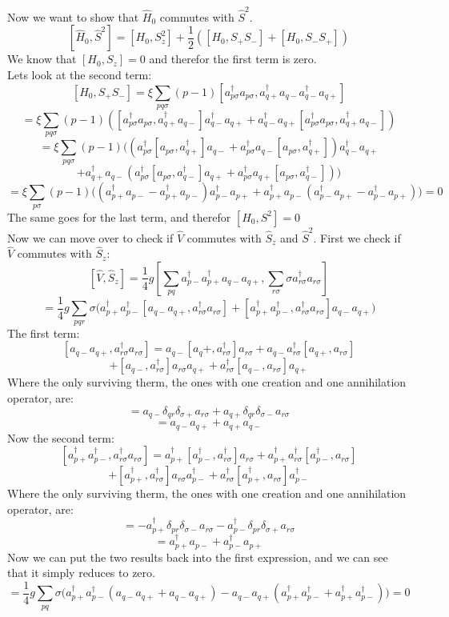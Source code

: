 \documentclass[a4paper,12pt]{article}
\begin{document}
Now we want to show that $\hat{ H}_0$ commutes with $\hat{ S}^2$.\\
$$[\hat{ H}_0, \hat{ S}^2] = [H_0,S_z^2] + \frac{1}{2} ([H_0,S_+S_-] + [H_0,S_-S_+])$$
We know that $[H_0,S_z] = 0$ and therefor the first term is zero.\\
Lets look at the second term:
$$[H_0,S_+S_-] = ξ  ∑_{ pq σ }^{} (p-1)[a_{p σ}^{†}a_{p σ},  a_{q + }^{†}a_{q -} a_{q-}^{†}a_{q+}]$$
$$ = ξ  ∑_{ pq σ }^{} (p-1) \left( 
[a_{p σ}^{†}a_{p σ},  a_{q + }^{†}a_{q -}]a_{q-}^{†}a_{q+}
+ 
a_{q-}^{†}a_{q+}[a_{p σ}^{†}a_{p σ},  a_{q + }^{†}a_{q -}]
\right)$$
$$ = ξ  ∑_{ pq σ }^{} (p-1) \Big(
    \left( a_{p σ}^{†} [a_{p σ}, a_{q + }^{†}] a_{q -} + a_{p σ}^{†} a_{q -} [a_{p σ}, a_{q + }^{†}] \right) a_{q-}^{†}a_{q+}$$
$$+
    a_{q+}^{†}a_{q-} \left( a_{p σ}^{†} [a_{p σ}, a_{q - }^{†}] a_{q +} + a_{p σ}^{†} a_{q +} [a_{p σ}, a_{q - }^{†}] \right)
\Big)$$
$$ = ξ  ∑_{ p σ }^{} (p-1) \Big( 
    \left( a_{p+}^{†}a_{p-} - a_{p+}^{†}a_{p-} \right)a_{p-}^{†}a_{p+} + a_{p+}^{†}a_{p-}\left( a_{p-}^{†}a_{p+} - a_{p-}^{†}a_{p+} \right) 
\Big) = 0$$
The same goes for the last term, and therefor $[H_0,S^2] = 0$\\ 
Now we can move over to check if $\hat{ V}$ commutes with $\hat{ S}_z$ and $\hat{ S}^2$. First we check if $\hat{ V}$ commutes with $\hat{ S}_z$:
$$[\hat{ V}, \hat{ S}_z] = \frac{1}{4} g[∑_{pq}^{} a_{p-}^{†}a_{p+}^{†} a_{q-}a_{q+}, ∑_{r σ }^{}σ a_{r σ}^{†}a_{r σ }]$$
$$ = \frac{1}{4} g ∑_{pqr} σ \Big( a_{p+}^{†} a_{p-}^{†}[a_{q-}a_{q+}, a_{r σ}^{†}a_{r σ}] + [a_{p+}^{†}a_{p-}^{†}, a_{r σ}^{†}a_{r σ}]a_{q-}a_{q+} \Big)$$
The first term: 
$$[a_{q-}a_{q+}, a_{r σ}^{†}a_{r σ}] = a_{q-}[a_q+,a_{r σ }^{†}]a_{r σ} + a_{q-}a_{r σ }^{†}[a_{q+},a_{r σ}]$$
$$ +  [a_{q-},a_{r σ}^{†}]a_{r σ}a_{q+} + a_{r σ}^{†}[a_{q-},a_{r σ}]a_{q+}$$
Where the only surviving therm, the ones with one creation and one annihilation operator, are:
$$ = a_{q-}δ_{qr}δ_{σ+}a_{r σ} + a_{q+}δ_{qr}δ_{σ-}a_{r σ}$$
$$ = a_{q-}a_{q +} + a_{q+}a_{q-}$$
Now the second term:
$$[a_{p+}^{†}a_{p-}^{†}, a_{r σ}^{†}a_{r σ}] = a_{p+}^{†}[a_{p-}^{†},a_{r σ}^{†}]a_{r σ} + a_{p+}^{†}a_{r σ}^{†}[a_{p-}^{†},a_{r σ}]$$
$$ + [a_{p+}^{†},a_{r σ}^{†}]a_{r σ}a_{p-}^{†} + a_{r σ}^{†}[a_{p+}^{†},a_{r σ}]a_{p-}^{†}$$
Where the only surviving therm, the ones with one creation and one annihilation operator, are:
$$ = -a_{p+}^{†}δ_{pr}δ_{σ-}a_{r σ} - a_{p-}^{†}δ_{pr}δ_{σ+}a_{r σ}$$
$$ = a_{p+}^{†}a_{p-} + a_{p-}^{†}a_{p+}$$
Now we can put the two results back into the first expression, and we can see that it simply reduces to zero.
$$ = \frac{1}{4} g ∑_{pq} σ \Big( a_{p+}^{†} a_{p-}^{†}(a_{q-}a_{q+} + a_{q-}a_{q+}) - a_{q-}a_{q+}(a_{p+}^{†}a_{p-}^{†} + a_{p+}^{†}a_{p-}^{†})  \Big)=0$$
\end{document}
